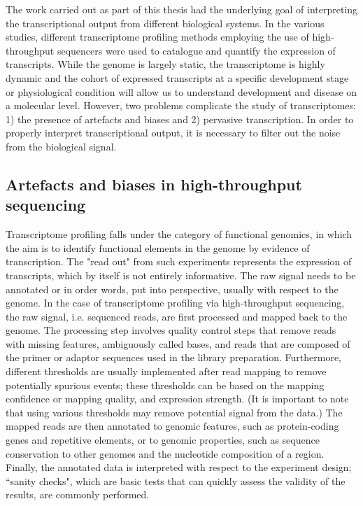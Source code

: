 The work carried out as part of this thesis had the underlying goal of interpreting the transcriptional output from different biological systems. In the various studies, different transcriptome profiling methods employing the use of high-throughput sequencers were used to catalogue and quantify the expression of transcripts. While the genome is largely static, the transcriptome is highly dynamic and the cohort of expressed transcripts at a specific development stage or physiological condition will allow us to understand development and disease on a molecular level. However, two problems complicate the study of transcriptomes: 1) the presence of artefacts and biases and 2) pervasive transcription. In order to properly interpret transcriptional output, it is necessary to filter out the noise from the biological signal.

\subsection{Artefacts and biases in high-throughput sequencing}

Transcriptome profiling falls under the category of functional genomics, in which the aim is to identify functional elements in the genome by evidence of transcription. The "read out" from such experiments represents the expression of transcripts, which by itself is not entirely informative. The raw signal needs to be annotated or in order words, put into perspective, usually with respect to the genome. In the case of transcriptome profiling via high-throughput sequencing, the raw signal, i.e. sequenced reads, are first processed and mapped back to the genome. The processing step involves quality control steps that remove reads with missing features, ambiguously called bases, and reads that are composed of the primer or adaptor sequences used in the library preparation. Furthermore, different thresholds are usually implemented after read mapping to remove potentially spurious events; these thresholds can be based on the mapping confidence or mapping quality, and expression strength. (It is important to note that using various thresholds may remove potential signal from the data.) The mapped reads are then annotated to genomic features, such as protein-coding genes and repetitive elements, or to genomic properties, such as sequence conservation to other genomes and the nucleotide composition of a region. Finally, the annotated data is interpreted with respect to the experiment design; ``sanity checks", which are basic tests that can quickly assess the validity of the results, are commonly performed.

